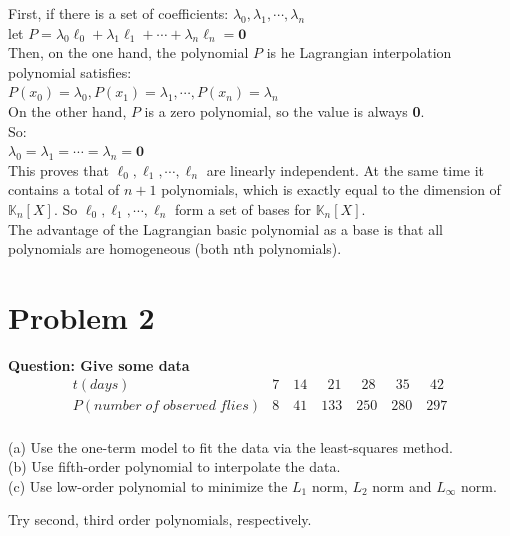 \documentclass[12pt,a4paper]{article}
\begin{document}
\begin{spacing}{1.5}
\noindent First, if there is a set of coefficients: $\lambda _{0}, \lambda _{1}, \cdots, \lambda _{n}$\\
let $P=\lambda _{0}\ell _{0}+\lambda _{1}\ell _{1}+\cdots +\lambda _{n}\ell _{n}=\textbf{0}$\\

\noindent Then, on the one hand, the polynomial $P$ is he Lagrangian interpolation polynomial satisfies: \\
$P(x_{0})=\lambda _{0}, P(x_{1})=\lambda _{1}, \cdots, P(x_{n})=\lambda _{n}$ \\

\noindent On the other hand, $P$ is a zero polynomial, so the value is always \textbf{0}. \\
So:\\
$\lambda _{0}=\lambda _{1}=\cdots =\lambda _{n}=\textbf{0}$\\

\noindent This proves that $\ell _{0}, \ell _{1}, \cdots, \ell _{n}$ are linearly independent. At the same time it contains a total of $n+1$ polynomials, which is exactly equal to the dimension of ${\mathbb {K}}_{n}[X]$. So $\ell _{0}, \ell _{1}, \cdots, \ell _{n}$ form a set of bases for ${\mathbb {K}}_{n}[X]$.\\

\noindent The advantage of the Lagrangian basic polynomial as a base is that all polynomials are homogeneous (both nth polynomials).

\newpage
\section{Problem 2}
\textbf{Question: Give some data}
\[
	\begin{array}{r|r}
	t(days) & 7 \quad 14 \quad\ \ 21 \quad\ \ 28 \quad\ \ 35\quad \ \ 42 \\
	\hline
	P(number\;of\;observed\;flies) & 8\quad41\quad133\quad250\quad280\quad297 \\
	\end{array}
\]

\noindent(a) Use the one-term model to fit the data via the least-squares method.\\
(b) Use fifth-order polynomial to interpolate the data.\\
(c) Use low-order polynomial to minimize the $L_1$ norm, $L_2$ norm and $L_\infty$ norm. 

Try second, third order polynomials, respectively.


\end{spacing}
\end{document}
